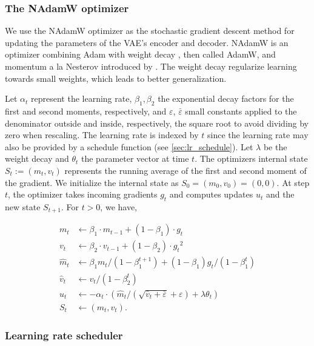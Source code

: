 \subsubsection{The NAdamW optimizer}

We use the NAdamW optimizer as the stochastic gradient descent method for updating the parameters of the VAE's encoder and decoder. NAdamW is an optimizer combining Adam \citep{kingma2017adam} with weight decay \citep{loshchilov2019decoupled}, then called AdamW, and momentum a la Nesterov introduced by \cite{dozat2016}. The weight decay regularize learning towards small weights, which leads to better generalization. 


Let $\alpha_t$ represent the learning rate, $\beta_1, \beta_2$ the exponential decay factors for the first and second moments, respectively, and $\varepsilon$, $\bar{\varepsilon}$ small constants applied to the denominator outside and inside, respectively, the square root to avoid dividing by zero when rescaling. The learning rate is
indexed by $t$ since the learning rate may also be provided by a
schedule function (see \autoref{sec:lr_schedule}). Let $\lambda$ be the weight decay and  $\theta_t$ the parameter vector at time $t$. The optimizers internal state $S_t := (m_t, v_t)$ represents the running average of the first and second moment of the gradient. We initialize the internal state as $S_0 = (m_0, v_0) = (0, 0)$. At step $t$, the optimizer takes incoming gradients $g_t$ and computes updates $u_t$ and the new state $S_{t+1}$. For $t > 0$, we have,


\begin{align*}
  m_t &\leftarrow \beta_1 \cdot m_{t-1} + (1-\beta_1) \cdot g_t \\
  v_t &\leftarrow \beta_2 \cdot v_{t-1} + (1-\beta_2) \cdot {g_t}^2 \\
  \hat{m}_t &\leftarrow \beta_1 m_t / {(1-\beta_1^{t+1})} + (1 - \beta_1) g_t / {(1-\beta_1^t)} \\
  \hat{v}_t &\leftarrow v_t / {(1-\beta_2^t)} \\
  u_t &\leftarrow -\alpha_t \cdot \left( \hat{m}_t / \left({\sqrt{\hat{v}_t 
  + \bar{\varepsilon}} + \varepsilon} \right) + \lambda \theta_{t} \right)\\
  S_t &\leftarrow (m_t, v_t).
\end{align*}


\subsubsection{Learning rate scheduler}\label{sec:lr_schedule}

